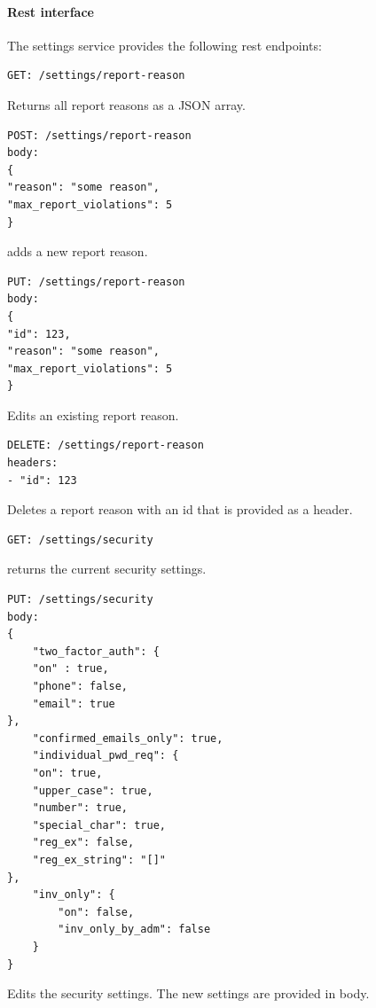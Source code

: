 \paragraph{Rest interface}
The settings service provides the following rest endpoints:

\begin{verbatim}
GET: /settings/report-reason
\end{verbatim}

Returns all report reasons as a JSON array.

\begin{verbatim}
POST: /settings/report-reason
body:
{
"reason": "some reason",
"max_report_violations": 5
}
\end{verbatim}
adds a new report reason.

\begin{verbatim}
PUT: /settings/report-reason
body:
{
"id": 123,
"reason": "some reason",
"max_report_violations": 5
}
\end{verbatim}
Edits an existing report reason.


\begin{verbatim}
DELETE: /settings/report-reason
headers:
- "id": 123
\end{verbatim}

Deletes a report reason with an id that is provided as a header.

\begin{verbatim}
GET: /settings/security
\end{verbatim}

returns the current security settings.

\begin{verbatim}
PUT: /settings/security
body:
{
    "two_factor_auth": {
    "on" : true,
    "phone": false,
    "email": true
},
    "confirmed_emails_only": true,
    "individual_pwd_req": {
    "on": true,
    "upper_case": true,
    "number": true,
    "special_char": true,
    "reg_ex": false,
    "reg_ex_string": "[]"
},
    "inv_only": {
        "on": false,
        "inv_only_by_adm": false
    }
}
\end{verbatim}
Edits the security settings.
The new settings are provided in body.

